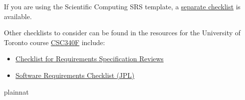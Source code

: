 \documentclass[12pt]{article}
\begin{document}
If you are using the Scientific Computing SRS template, a
\href{https://github.com/smiths/capTemplate/blob/main/docs/Checklists/SRS-SciComp-Checklist.pdf}
{separate checklist} is available.

Other checklists to consider can be found in the resources for the University of
Toronto course
\href{https://www.cs.toronto.edu/~sme/CSC340F/2005/assignments/inspections/}
{CSC340F} include:

\begin{itemize}
  \item
  \href{https://www.cs.toronto.edu/~sme/CSC340F/2005/assignments/inspections/reqts_checklist.pdf}
  {Checklist for Requirements Specification Reviews}
  \item
  \href{https://www.cs.toronto.edu/~sme/CSC340F/2005/assignments/inspections/JPL_reqts_clist.pdf}
  {Software Requirements Checklist (JPL)}
\end{itemize}

 {plainnat}

\end{document}

